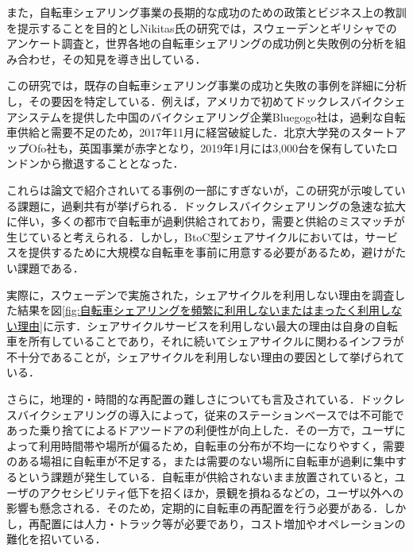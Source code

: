           \par また，自転車シェアリング事業の長期的な成功のための政策とビジネス上の教訓を提示することを目的としNikitas氏の研究では，スウェーデンとギリシャでのアンケート調査と，世界各地の自転車シェアリングの成功例と失敗例の分析を組み合わせ，その知見を導き出している．
          \par この研究では，既存の自転車シェアリング事業の成功と失敗の事例を詳細に分析し，その要因を特定している．例えば，アメリカで初めてドックレスバイクシェアシステムを提供した中国のバイクシェアリング企業Bluegogo社は，過剰な自転車供給と需要不足のため，2017年11月に経営破綻した．北京大学発のスタートアップOfo社も，英国事業が赤字となり，2019年1月には3,000台を保有していたロンドンから撤退することとなった．
          \par これらは論文で紹介されいてる事例の一部にすぎないが，この研究が示唆している課題に，過剰共有が挙げられる．ドックレスバイクシェアリングの急速な拡大に伴い，多くの都市で自転車が過剰供給されており，需要と供給のミスマッチが生じていると考えられる．しかし，BtoC型シェアサイクルにおいては，サービスを提供するために大規模な自転車を事前に用意する必要があるため，避けがたい課題である．
          \par 実際に，スウェーデンで実施された，シェアサイクルを利用しない理由を調査した結果を図\ref{fig:自転車シェアリングを頻繁に利用しないまたはまったく利用しない理由}に示す．シェアサイクルサービスを利用しない最大の理由は自身の自転車を所有していることであり，それに続いてシェアサイクルに関わるインフラが不十分であることが，シェアサイクルを利用しない理由の要因として挙げられている．
          \par さらに，地理的・時間的な再配置の難しさについても言及されている．ドックレスバイクシェアリングの導入によって，従来のステーションベースでは不可能であった乗り捨てによるドアツードアの利便性が向上した．その一方で，ユーザによって利用時間帯や場所が偏るため，自転車の分布が不均一になりやすく，需要のある場祖に自転車が不足する，または需要のない場所に自転車が過剰に集中するという課題が発生している．自転車が供給されないまま放置されていると，ユーザのアクセシビリティ低下を招くほか，景観を損ねるなどの，ユーザ以外への影響も懸念される．そのため，定期的に自転車の再配置を行う必要がある．しかし，再配置には人力・トラック等が必要であり，コスト増加やオペレーションの難化を招いている．

